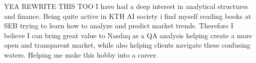 \documentclass[../../main.tex]{subfiles}
\begin{document}
YEA REWRITE THIS TOO
I have had a deep interest in analytical structures and finance. Being quite active in KTH AI society i find myself reading books at SEB trying to learn how to analyze and predict market trends. Therefore I believe I can bring great value to Nasdaq as a QA analysis helping create a more open and transparent market, while also helping clients navigate these confusing waters. Helping me make this hobby into a career.
\\
\end{document}
